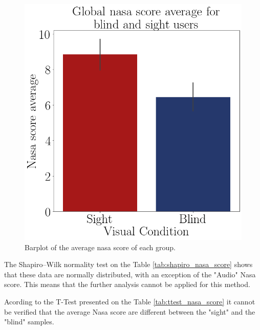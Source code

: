 \begin{figure}[!htb]
\begin{minipage}{.45\linewidth}
    \end{minipage}
    \begin{minipage}{.1\linewidth}
        \hfill
    \end{minipage}
    \begin{minipage}{.45\linewidth}
        \centering
        \vspace{1.8cm}
        \includegraphics[width = \linewidth]{Resultados/Nasa/Figuras/png/barplot_nasa_avg_global.png}
        \caption{Barplot of the average nasa score of each group.}
        \label{fig:barplot_nasa_global}
    \end{minipage}
\end{figure}

The Shapiro–Wilk normality test on the Table \ref{tab:shapiro_nasa_score} shows that these data are normally distributed, with an exception of the "Audio" Nasa score. This means that the further analysis cannot be applied for this method.



Acording to the T-Test presented on the Table \ref{tab:ttest_nasa_score} it cannot be verified that the average Nasa score are different between the "sight" and the "blind" samples.

